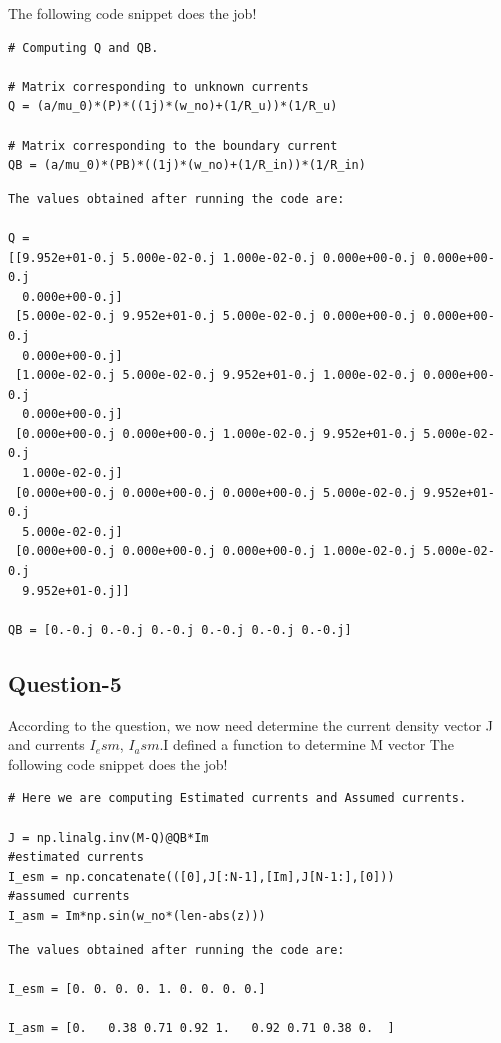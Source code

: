 \documentclass{article}
\begin{document}
\newline The following code snippet does the job!
\begin{verbatim}
# Computing Q and QB.

# Matrix corresponding to unknown currents
Q = (a/mu_0)*(P)*((1j)*(w_no)+(1/R_u))*(1/R_u)

# Matrix corresponding to the boundary current
QB = (a/mu_0)*(PB)*((1j)*(w_no)+(1/R_in))*(1/R_in)

\end{verbatim}
\begin{lstlisting}
The values obtained after running the code are:

Q = 
[[9.952e+01-0.j 5.000e-02-0.j 1.000e-02-0.j 0.000e+00-0.j 0.000e+00-0.j
  0.000e+00-0.j]
 [5.000e-02-0.j 9.952e+01-0.j 5.000e-02-0.j 0.000e+00-0.j 0.000e+00-0.j
  0.000e+00-0.j]
 [1.000e-02-0.j 5.000e-02-0.j 9.952e+01-0.j 1.000e-02-0.j 0.000e+00-0.j
  0.000e+00-0.j]
 [0.000e+00-0.j 0.000e+00-0.j 1.000e-02-0.j 9.952e+01-0.j 5.000e-02-0.j
  1.000e-02-0.j]
 [0.000e+00-0.j 0.000e+00-0.j 0.000e+00-0.j 5.000e-02-0.j 9.952e+01-0.j
  5.000e-02-0.j]
 [0.000e+00-0.j 0.000e+00-0.j 0.000e+00-0.j 1.000e-02-0.j 5.000e-02-0.j
  9.952e+01-0.j]]
  
QB = [0.-0.j 0.-0.j 0.-0.j 0.-0.j 0.-0.j 0.-0.j]
\end{lstlisting}

\subsection{Question-5}
According to the question, we now need determine the current density vector J and currents $I_esm$, $I_asm$.I defined a function to determine M vector
\newline The following code snippet does the job!
\begin{verbatim}
# Here we are computing Estimated currents and Assumed currents.

J = np.linalg.inv(M-Q)@QB*Im
#estimated currents
I_esm = np.concatenate(([0],J[:N-1],[Im],J[N-1:],[0]))
#assumed currents
I_asm = Im*np.sin(w_no*(len-abs(z)))
\end{verbatim}
\begin{lstlisting}
The values obtained after running the code are:

I_esm = [0. 0. 0. 0. 1. 0. 0. 0. 0.]

I_asm = [0.   0.38 0.71 0.92 1.   0.92 0.71 0.38 0.  ]
\end{lstlisting}
\end{document}
